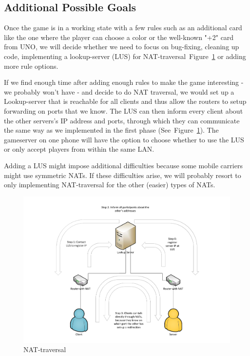 \documentclass{sig-alternate}
\newcommand{\lfig}[1]{\label{fig:#1}}
\newcommand{\rfig}[1]{Figure~\ref{fig:#1}}
\begin{document}
\subsection{Additional Possible Goals}
Once the game is in a working state with a few rules such as an additional card like the one where the player can choose a color or the well-known "+2" card from UNO, we will decide whether we need to focus on bug-fixing, cleaning up code, implementing a lookup-server (LUS) for NAT-traversal~\rfig{nat} or adding more rule options. 

If we find enough time after adding enough rules to make the game interesting - we probably won't have - and decide to do NAT traversal, we would set up a Lookup-server that is reachable for all clients and thus allow the routers to setup forwarding on ports that we know. The LUS can then inform every client about the other servers's IP address and ports, through which they can communicate the same way as we implemented in the first phase (See~\rfig{nat}). The gameserver on one phone will have the option to choose whether to use the LUS or only accept players from within the same LAN.

Adding a LUS might impose additional difficulties because some mobile carriers might use symmetric NATs. If these difficulties arise, we will probably resort to only implementing NAT-traversal for the other (easier) types of NATs.

\begin{figure}[!htbp]
	\centering
    \includegraphics[width=\columnwidth]{NATholepunching.pdf}
    \vspace{-5mm} %
	\caption{NAT-traversal}
	\lfig{nat}
\end{figure}
\end{document}

